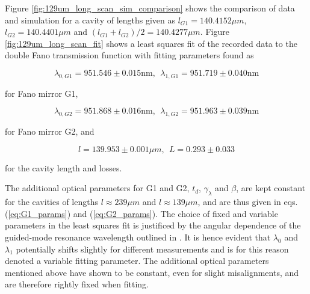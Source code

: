 Figure \ref{fig:129um_long_scan_sim_comparison} shows the comparison of data and simulation for a cavity of lengths given as $l_{G1} = 140.4152 \mu m$, $l_{G2} = 140.4401 \mu m$ and $(l_{G1} + l_{G2})/2 = 140.4277 \mu m$. Figure \ref{fig:129um_long_scan_fit} shows a least squares fit of the recorded data to the double Fano transmission function with fitting parameters found as 

\begin{equation}
    \lambda_{0,G1} = 951.546 \pm 0.015 \text{nm}, \:\: \lambda_{1,G1} = 951.719 \pm 0.040 \text{nm}
\end{equation}

for Fano mirror G1,

\begin{equation}
    \lambda_{0,G2} = 951.868 \pm 0.016 \text{nm}, \:\: \lambda_{1,G2} = 951.963 \pm 0.039 \text{nm}
\end{equation}

for Fano mirror G2, and

\begin{equation}
    l = 139.953 \pm 0.001 \mu m, \:\: L = 0.293 \pm 0.033
\end{equation}

for the cavity length and losses.

The additional optical parameters for G1 and G2, $t_d$, $\gamma_{\lambda}$ and $\beta$, are kept constant for the cavities of lengths $l\approx 239 \mu m$ and $l \approx 139 \mu m$, and are thus given in eqs. (\ref{eq:G1_params}) and (\ref{eq:G2_params}). The choice of fixed and variable parameters in the least squares fit is justificed by the angular dependence of the guided-mode resonance wavelength outlined in \cite{Parthenopoulos}. It is hence evident that $\lambda_0$ and $\lambda_1$ potentially shifts slightly for different measurements and is for this reason denoted a variable fitting parameter. The additional optical parameters mentioned above have shown to be constant, even for slight misalignments, and are therefore rightly fixed when fitting. 

